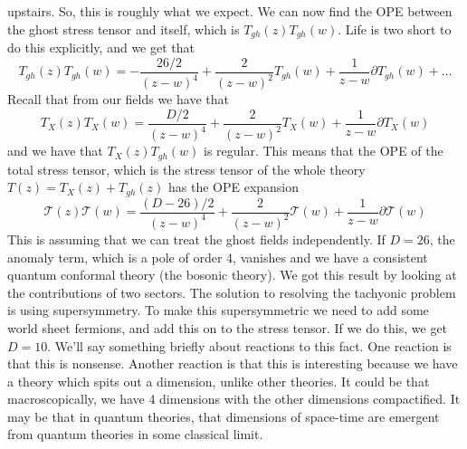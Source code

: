 \documentclass[11pt, oneside]{article}   	%
\theoremstyle{slanted}
\begin{document}
upstairs. So, this is roughly what we 
expect. 
We can now find the OPE between the ghost stress tensor and 
itself, which is $ T_{gh}\left( z  \right)  T _{ gh } \left(  w  \right)   $. 
Life is two short to do 
this explicitly, and we get that 
\[
	T_{gh} \left( z  \right)  T _{gh } \left(  w  \right)  
	=  - \frac{26 /2 }{\left( z - w  \right)  ^ 4  } + \frac{2}{\left( z - w  \right)  ^ 2 } T _{gh } \left(  w  \right)  
	+ \frac{1}{z - w } \partial  T _{gh } \left( w  \right)  + \dots 
\] Recall that from our 
fields we have that 
\[
	T _ X \left(  z  \right)  T  _ X \left(  w  \right)  
	= \frac{D / 2  }{ \left( z - w  \right)  ^ 4  } + \frac{2}{\left( z - w  \right)  ^ 2  }
	T _ X \left(  w  \right)  + \frac{1}{z - w } \partial  T _  X \left(  w  \right) 
\] and we have that $ T _ X \left( z   \right)  T _{ gh } \left( w   \right) $ 
is regular. 
This means that the OPE of the total stress tensor, 
which is the stress tensor of the whole 
theory $ T \left( z  \right)   = T  _  X \left( z  \right)  + T _{gh } \left(  z  \right)   $ 
has the OPE expansion
\[
	\mathcal{ T } \left(  z  \right)  \mathcal{ T } \left( w  \right)  
	= \frac{\left(  D - 26  \right)   / 2 }{ \left(  z - w  \right)  ^  4 }
	+ \frac{2}{\left( z - w  \right)  ^ 2} \mathcal{ T } \left(  w  \right)  + \frac{1}{z -  w } \partial \mathcal{ T } \left(  w \right) 
\] This is assuming 
that we can treat the ghost fields independently. 
If $ D = 26 $, the anomaly term, which is a pole of order 4, 
vanishes and we have a consistent quantum conformal theory (the bosonic theory). 
We got this result by looking at the contributions of two sectors. 
The solution to resolving the tachyonic problem 
is using supersymmetry. 
To make this supersymmetric we need to add some world sheet fermions, 
and add this on to the stress tensor. 
If we do this, we get $ D = 10 $. 
We'll say something briefly about reactions to this fact. 
One reaction is that this is nonsense. Another reaction 
is that this is interesting because we have a theory which 
spits out a dimension, unlike other theories. 
It could be that macroscopically, we have 4 dimensions with 
the other dimensions compactified. 
It may be that in quantum theories, that dimensions of 
space-time are emergent from quantum theories in 
some classical limit. 
\end{document}
